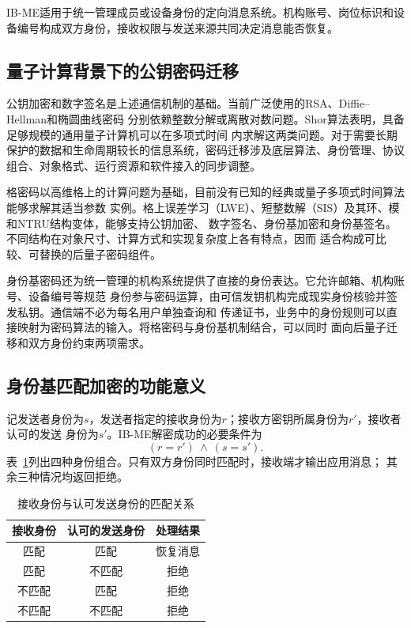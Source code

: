 IB-ME适用于统一管理成员或设备身份的定向消息系统。机构账号、岗位标识和设备编号构成双方身份，接收权限与发送来源共同决定消息能否恢复。

\subsection{量子计算背景下的公钥密码迁移}

公钥加密和数字签名是上述通信机制的基础。当前广泛使用的RSA、Diffie--Hellman和椭圆曲线密码
分别依赖整数分解或离散对数问题。Shor算法表明，具备足够规模的通用量子计算机可以在多项式时间
内求解这两类问题\cite{shor1994}。对于需要长期保护的数据和生命周期较长的信息系统，密码迁移涉及底层算法、身份管理、协议组合、对象格式、运行资源和软件接入的同步调整。

格密码以高维格上的计算问题为基础，目前没有已知的经典或量子多项式时间算法能够求解其适当参数
实例。格上误差学习（LWE）、短整数解（SIS）及其环、模和NTRU结构变体，能够支持公钥加密、
数字签名、身份基加密和身份基签名。不同结构在对象尺寸、计算方式和实现复杂度上各有特点，因而
适合构成可比较、可替换的后量子密码组件。

身份基密码还为统一管理的机构系统提供了直接的身份表达。它允许邮箱、机构账号、设备编号等规范
身份参与密码运算，由可信发钥机构完成现实身份核验并签发私钥。通信端不必为每名用户单独查询和
传递证书，业务中的身份规则可以直接映射为密码算法的输入。将格密码与身份基机制结合，可以同时
面向后量子迁移和双方身份约束两项需求。

\subsection{身份基匹配加密的功能意义}

记发送者身份为$s$，发送者指定的接收身份为$r$；接收方密钥所属身份为$r'$，接收者认可的发送
身份为$s'$。IB-ME解密成功的必要条件为
\[
  (r=r')\ \land\ (s=s').
\]
表~\ref{tab:identity-cases}列出四种身份组合。只有双方身份同时匹配时，接收端才输出应用消息；
其余三种情况均返回拒绝。

\begin{table}[H]
\centering\small
\caption{接收身份与认可发送身份的匹配关系}
\label{tab:identity-cases}
\begin{tabular}{ccc}
\toprule
\rowcolor{black!8} 接收身份 & 认可的发送身份 & 处理结果 \\
\midrule
匹配 & 匹配 & 恢复消息 \\
匹配 & 不匹配 & 拒绝 \\
不匹配 & 匹配 & 拒绝 \\
不匹配 & 不匹配 & 拒绝 \\
\bottomrule
\end{tabular}
\end{table}

